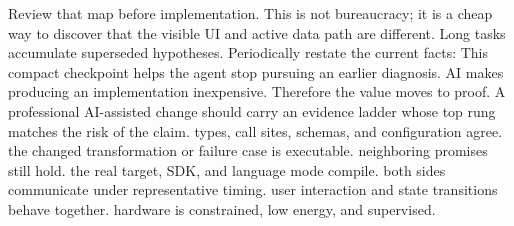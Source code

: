 {}Review that map before implementation. This is not bureaucracy; it is a cheap\markdownRendererSoftLineBreak
{}way to discover that the visible UI and active data path are different.\markdownRendererInterblockSeparator
{}
\markdownRendererSectionEnd \markdownRendererSectionBegin
{}\markdownRendererInterblockSeparator
{}Long tasks accumulate superseded hypotheses. Periodically restate the current\markdownRendererSoftLineBreak
{}facts:\markdownRendererInterblockSeparator
{}\markdownRendererInterblockSeparator
{}This compact checkpoint helps the agent stop pursuing an earlier diagnosis.\markdownRendererInterblockSeparator
{}\markdownRendererThematicBreak{}\markdownRendererInterblockSeparator
{}
\markdownRendererSectionEnd 
\markdownRendererSectionEnd \markdownRendererSectionBegin
{}\markdownRendererInterblockSeparator
{}AI makes producing an implementation inexpensive. Therefore the value moves to\markdownRendererSoftLineBreak
{}proof. A professional AI-assisted change should carry an evidence ladder whose\markdownRendererSoftLineBreak
{}top rung matches the risk of the claim.\markdownRendererInterblockSeparator
{}\markdownRendererSectionBegin
{}\markdownRendererInterblockSeparator
{}\markdownRendererOlBegin
{} types, call sites, schemas, and configuration agree.\markdownRendererOlItemEnd 
{} the changed transformation or failure case is executable.\markdownRendererOlItemEnd 
{} neighboring promises still hold.\markdownRendererOlItemEnd 
{} the real target, SDK, and language mode compile.\markdownRendererOlItemEnd 
{} both sides communicate under representative timing.\markdownRendererOlItemEnd 
{} user interaction and state transitions behave together.\markdownRendererOlItemEnd 
{} hardware is constrained, low energy, and supervised.\markdownRendererOlItemEnd 
